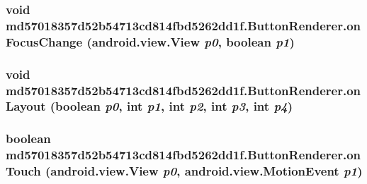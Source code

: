 \hypertarget{classmd57018357d52b54713cd814fbd5262dd1f_1_1_button_renderer_b3de4f03873d707b061b0aea023eb81c}{
\subsubsection[{onFocusChange}]{\setlength{\rightskip}{0pt plus 5cm}void md57018357d52b54713cd814fbd5262dd1f.ButtonRenderer.onFocusChange (android.view.View {\em p0}, \/  boolean {\em p1})}}
\label{classmd57018357d52b54713cd814fbd5262dd1f_1_1_button_renderer_b3de4f03873d707b061b0aea023eb81c}


\hypertarget{classmd57018357d52b54713cd814fbd5262dd1f_1_1_button_renderer_ea95208e7b65ea2e2fab71a2b027d47b}{
\subsubsection[{onLayout}]{\setlength{\rightskip}{0pt plus 5cm}void md57018357d52b54713cd814fbd5262dd1f.ButtonRenderer.onLayout (boolean {\em p0}, \/  int {\em p1}, \/  int {\em p2}, \/  int {\em p3}, \/  int {\em p4})}}
\label{classmd57018357d52b54713cd814fbd5262dd1f_1_1_button_renderer_ea95208e7b65ea2e2fab71a2b027d47b}


\hypertarget{classmd57018357d52b54713cd814fbd5262dd1f_1_1_button_renderer_0c1824c75b7d6feae196c43f64997685}{
\subsubsection[{onTouch}]{\setlength{\rightskip}{0pt plus 5cm}boolean md57018357d52b54713cd814fbd5262dd1f.ButtonRenderer.onTouch (android.view.View {\em p0}, \/  android.view.MotionEvent {\em p1})}}
\label{classmd57018357d52b54713cd814fbd5262dd1f_1_1_button_renderer_0c1824c75b7d6feae196c43f64997685}



